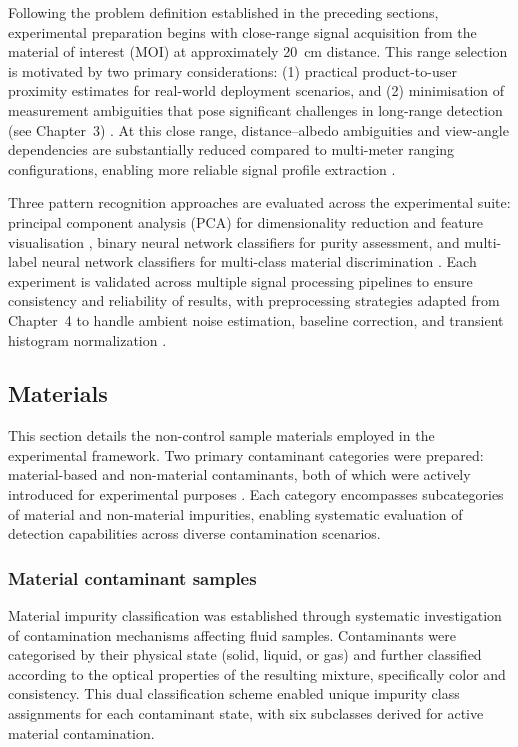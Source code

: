 \documentclass[12pt,a4paper,oneside]{report}
\begin{document}
Following the problem definition established in the preceding sections, experimental preparation begins with close-range signal acquisition from the material of interest (MOI) at approximately 20~cm distance. This range selection is motivated by two primary considerations: (1) practical product-to-user proximity estimates for real-world deployment scenarios, and (2) minimisation of measurement ambiguities that pose significant challenges in long-range detection (see Chapter~3) \cite{jungerman2022,tontini2020}. At this close range, distance--albedo ambiguities and view-angle dependencies are substantially reduced compared to multi-meter ranging configurations, enabling more reliable signal profile extraction \cite{becker2023,su2016}.

Three pattern recognition approaches are evaluated across the experimental suite: principal component analysis (PCA) for dimensionality reduction and feature visualisation \cite{wold1987}, binary neural network classifiers for purity assessment, and multi-label neural network classifiers for multi-class material discrimination \cite{lecun1998,bishop2006}. Each experiment is validated across multiple signal processing pipelines to ensure consistency and reliability of results, with preprocessing strategies adapted from Chapter~4 to handle ambient noise estimation, baseline correction, and transient histogram normalization \cite{tontini2024}.


\subsection{Materials}
\label{subsec:materials_chapter6}

This section details the non-control sample materials employed in the experimental framework. Two primary contaminant categories were prepared: material-based and non-material contaminants, both of which were actively introduced for experimental purposes \cite{joolaei2025,chandra2024}. Each category encompasses subcategories of material and non-material impurities, enabling systematic evaluation of detection capabilities across diverse contamination scenarios.

\subsubsection{Material contaminant samples}
\label{subsec:material_contaminant_samples_chapter6}

Material impurity classification was established through systematic investigation of contamination mechanisms affecting fluid samples. Contaminants were categorised by their physical state (solid, liquid, or gas) and further classified according to the optical properties of the resulting mixture, specifically color and consistency. This dual classification scheme enabled unique impurity class assignments for each contaminant state, with six subclasses derived for active material contamination.
\end{document}
